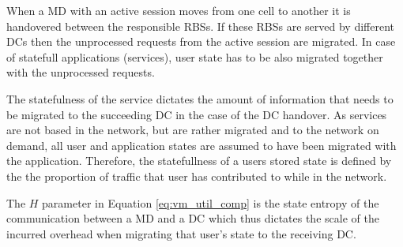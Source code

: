 


When a \ac{MD} with an active session moves from one cell to another it is handovered between the responsible \ac{RBS}s.
If these \ac{RBS}s are served by different \ac{DC}s then the unprocessed requests from the active session are migrated.
In case of statefull applications (services), user state has to be also migrated together with the unprocessed requests.

The statefulness of the service dictates the amount of information that needs to be migrated to the succeeding \ac{DC} in the case of the \ac{DC} handover. As services are not based in the network, but are rather migrated and to the \xcloud{} network on demand, all user and application states are assumed to have been migrated with the application. Therefore, the statefullness of a users stored state is defined by the the proportion of traffic that user has contributed to while in the network.

The $H$ parameter in Equation \ref{eq:vm_util_comp} is the state entropy of the communication between a \ac{MD} and a \ac{DC} which thus dictates the scale of the incurred overhead when migrating that user's state  to the receiving \ac{DC}.
